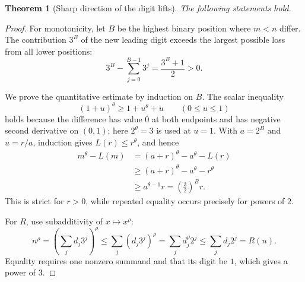 \documentclass[11pt]{article}
\newtheorem{theorem}{Theorem}[section]
\theoremstyle{definition}
\theoremstyle{remark}
\newcommand{\N}{\mathbb N}
\begin{document}
\begin{theorem}[Sharp direction of the digit lifts]\label{thm:digit-lift-power}
The following statements hold.
\end{theorem}

\begin{proof}
For monotonicity, let $B$ be the highest binary position where $m<n$ differ.  The
contribution $3^B$ of the new leading digit exceeds the largest possible loss from
all lower positions:
\[
 3^B-\sum_{j=0}^{B-1}3^j=\frac{3^B+1}{2}>0.
\]

We prove the quantitative estimate by induction on $B$.  The scalar inequality
\begin{equation}\label{eq:scalar-convexity}
 (1+u)^\theta\ge1+u^\theta+u
 \qquad(0\le u\le1)
\end{equation}
holds because the difference has value $0$ at both endpoints and has negative
second derivative on $(0,1)$; here $2^$ is used at $u=1$.  With
$a=2^B$ and $u=r/a$, induction gives $L(r)\le r^\theta$, and hence
\[
 \begin{split}
 m^\theta-L(m)
 &=(a+r)^\theta-a^\theta-L(r)\\
 &\ge(a+r)^\theta-a^\theta-r^\theta\\
 &\ge a^{\theta-1}r
 =\left(\frac32\right)^B r.
 \end{split}
\]
This is strict for $r>0$, while repeated equality occurs precisely for powers of
$2$.

For $R$, use subadditivity of $x\mapsto x^\rho$:
\[
 n^\rho
 =\left(\sum_jd_j3^j\right)^\rho
 \le\sum_j(d_j3^j)^\rho
 =\sum_jd_j^\rho2^j
 \le\sum_jd_j2^j=R(n).
\]
Equality requires one nonzero summand and that its digit be $1$, which gives a power
of $3$.
\end{proof}
\end{document}
